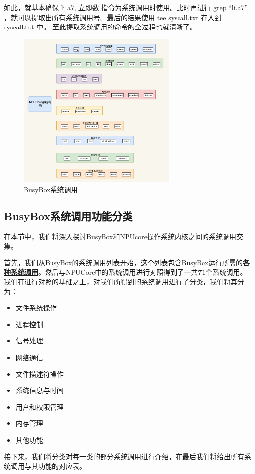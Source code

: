 如此，就基本确保 li a7, 立即数 指令为系统调用时使用。此时再进行 grep \enquote{li.a7} ，就可以提取出所有系统调用号。最后的结果使用 tee syscall.txt 存入到 syscall.txt 中。
至此提取系统调用的命令的全过程也就清晰了。

\begin{figure}[h]
    \centering
    \includegraphics[width=0.7\textwidth]{figures/09-03-NPUCore系统调用.png}
    \caption{
        BusyBox系统调用
    }
    \label{fig:BusyBox系统调用}
\end{figure}
\subsection{BusyBox系统调用功能分类}
    
在本节中，我们将深入探讨BusyBox和NPUcore操作系统内核之间的系统调用交集。

首先，我们从BusyBox的系统调用列表开始，这个列表包含BusyBox运行所需的\textbf{\href{https://gitee.com/oscomp/testsuits-for-oskernel/blob/final-comp/docs/busybox_musl_static_syscall.txt}{各种系统调用}}。然后与NPUCore中的系统调用进行对照得到了一共\textbf{71}个系统调用。我们在进行对照的基础之上，对我们所得到的系统调用进行了分类，我们将其分为：

\begin{itemize}
  \item 文件系统操作
  \item 进程控制
  \item 信号处理
  \item 网络通信
  \item 文件描述符操作
  \item 系统信息与时间
  \item 用户和权限管理
  \item 内存管理
  \item 其他功能
\end{itemize}
接下来，我们将分类对每一类的部分系统调用进行介绍，在最后我们将给出所有系统调用与其功能的对应表。
